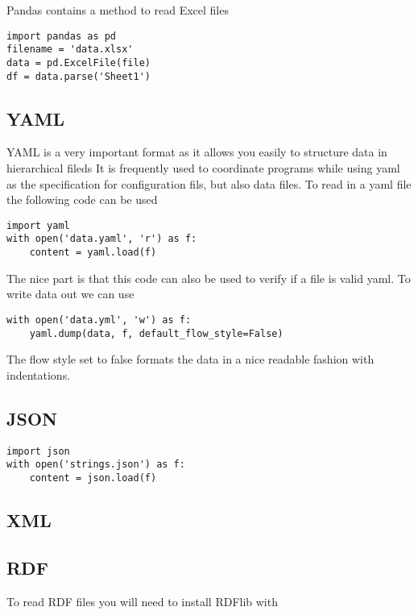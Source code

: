 Pandas contains a method to read Excel files

\begin{verbatim}
import pandas as pd
filename = 'data.xlsx'
data = pd.ExcelFile(file)
df = data.parse('Sheet1')
\end{verbatim}

\subsection{YAML}

YAML is a very important format as it allows you easily to structure
data in hierarchical fileds It is frequently used to coordinate
programs while using yaml as the specification for configuration fils,
but also data files. To read in a yaml file the following code can be
used

\begin{verbatim}
import yaml
with open('data.yaml', 'r') as f:
    content = yaml.load(f)
\end{verbatim}

The nice part is that this code can also be used to verify if a file
is valid yaml. To write data out we can use

\begin{verbatim}
with open('data.yml', 'w') as f:
    yaml.dump(data, f, default_flow_style=False)
\end{verbatim}

The flow style set to false formats the data in a nice readable
fashion with indentations.


\subsection{JSON}

\begin{verbatim}
import json
with open('strings.json') as f:
    content = json.load(f)
\end{verbatim}

\subsection{XML}


\subsection{RDF}

To read RDF files you will need to install RDFlib with 

